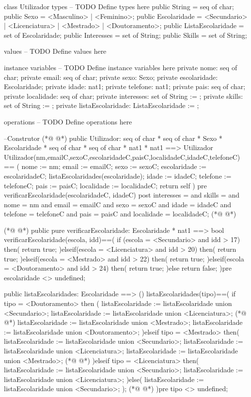 \begin{vdmpp}[breaklines=true]
class Utilizador
types
-- TODO Define types here
 public String = seq of char;
 public Sexo = <Masculino> | <Feminino>;
 public Escolaridade = <Secundario> | <Licenciatura> | <Mestrado> | <Doutoramento>;
 public ListaEscolaridade = set of Escolaridade;
 public Interesses = set of String;
 public Skills = set of String;
 
values
-- TODO Define values here

instance variables
-- TODO Define instance variables here
 private nome: seq of char;
 private email: seq of char;
 private sexo: Sexo;
 private escolaridade: Escolaridade;
 private idade: nat1;
 private telefone: nat1;
 private pais: seq of char;
 private localidade: seq of char;
 private interesses: set of String := {};
 private skills: set of String := {};
 private listaEscolaridade: ListaEscolaridade := {};
 
operations
-- TODO Define operations here

 --Construtor
(*@
\label{Utilizador:32}
@*)
 public Utilizador: seq of char * seq of char * Sexo * Escolaridade * seq of char * seq of char * nat1 * nat1 ==> Utilizador
 Utilizador(nm,emailC,sexoC,escolaridadeC,paisC,localidadeC,idadeC,telefoneC) == (
  nome := nm;
  email := emailC;
  sexo := sexoC;
  escolaridade := escolaridadeC;
  listaEscolaridades(escolaridade);
  idade := idadeC;
  telefone := telefoneC;
  pais := paisC;
  localidade := localidadeC;
  return self
 )
 pre verificarEscolaridade(escolaridadeC, idadeC)
 post interesses = {} and
   skills = {} and
   nome = nm and
   email = emailC and
   sexo = sexoC and
   idade = idadeC and
   telefone = telefoneC and
   pais = paisC and
   localidade = localidadeC;
(*@
\label{listaEscolaridades:55}
@*)
 
(*@
\label{verificarEscolaridade:56}
@*)
 public pure verificarEscolaridade: Escolaridade * nat1 ==> bool
 verificarEscolaridade(escola, idd)==(
 if (escola = <Secundario> and idd > 17) then(
  return true;
 )elseif(escola = <Licenciatura> and idd > 20) then(
  return true;
 )elseif(escola = <Mestrado> and idd > 22) then(
  return true;
 )elseif(escola = <Doutoramento> and idd > 24) then(
  return true;
 )else
  return false;
 )pre escolaridade <> undefined;
 
 public listaEscolaridades: Escolaridade ==> ()
 listaEscolaridades(tipo)==(
 if tipo = <Doutoramento> then (
  listaEscolaridade := listaEscolaridade union {<Secundario>};
  listaEscolaridade := listaEscolaridade union {<Licenciatura>};
(*@
\label{addInteresse:75}
@*)
  listaEscolaridade := listaEscolaridade union {<Mestrado>};
  listaEscolaridade := listaEscolaridade union {<Doutoramento>};
 )elseif tipo = <Mestrado> then(
  listaEscolaridade := listaEscolaridade union {<Secundario>};
  listaEscolaridade := listaEscolaridade union {<Licenciatura>};
  listaEscolaridade := listaEscolaridade union {<Mestrado>};
(*@
\label{removeInteresse:81}
@*)
 )elseif tipo = <Licenciatura> then(
  listaEscolaridade := listaEscolaridade union {<Secundario>};
  listaEscolaridade := listaEscolaridade union {<Licenciatura>};
 )else(
  listaEscolaridade := listaEscolaridade union {<Secundario>};
 );
(*@
\label{getInteresses:87}
@*)
 )pre tipo <> undefined;
 

\end{vdmpp}
